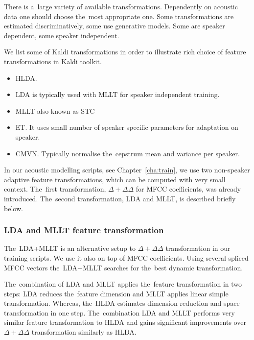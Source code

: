 There is a~large variety of available transformations. 
Dependently on acoustic data one should choose the~most appropriate one.
Some transformations are estimated discriminatively, some use generative models.
Some are speaker dependent, some speaker independent.

We list some of Kaldi transformations in order to illustrate rich choice of feature transformations in Kaldi toolkit.
\begin{itemize}
    \item \acf{HLDA}\cite{gales1999semi}.
    \item \acf{LDA}\cite{gopinath1998maximum} is typically used with \acs{MLLT} for speaker independent training.
    \item \acf{MLLT} also known as \acf{STC}\cite{gopinath1998maximum}
    \item \acf{ET}\cite{povey2011exponential}. It uses small number of speaker specific parameters for adaptation on speaker.
    \item \acf{CMVN}\cite{molau2003feature}. Typically normalise the~cepstrum mean and variance per speaker.
\end{itemize}

In our acoustic modelling scripts, see Chapter~\ref{cha:train},  we use two non-speaker adaptive feature transformations, which can be computed with very small context. 
The~first transformation, $\Delta+\Delta\Delta$  for \ac{MFCC} coefficients, was already introduced.
The~second transformation, \ac{LDA} and \ac{MLLT}, is described briefly below.

\subsubsection*{\acl{LDA} and \ac{MLLT} feature transformation}
The~\ac{LDA}+\ac{MLLT} is an alternative setup to $\Delta+\Delta\Delta$ transformation in our training scripts.
We use it also on top of \ac{MFCC} coefficients.
Using several spliced \ac{MFCC} vectors the~\ac{LDA}+\ac{MLLT} searches for the~best dynamic transformation.

The~combination of \ac{LDA} and \ac{MLLT} applies the~feature transformation in two steps: \ac{LDA} reduces the~feature dimension and \ac{MLLT} applies linear simple transformation\cite{gopinath1998maximum}.
Whereas, the~\ac{HLDA} estimates dimension reduction and space transformation in one step.\cite{gales1999semi}
The~combination \ac{LDA} and \ac{MLLT} performs very similar feature transformation to \ac{HLDA} and gains significant improvements over $\Delta+\Delta\Delta$ transformation similarly as \ac{HLDA}\cite{gales1999semi}\cite{gopinath1998maximum}.

